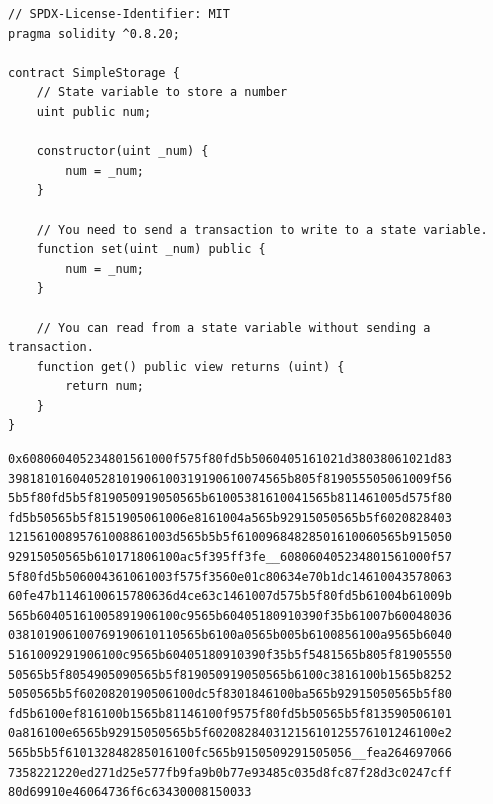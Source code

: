 \begin{lstlisting}[caption={Example of a simple Solidity smart contract that stores a variable on the blockchain and allows edits to it.},label={lst:solidity-example},captionpos=b, style=boxed]
// SPDX-License-Identifier: MIT
pragma solidity ^0.8.20;

contract SimpleStorage {
    // State variable to store a number
    uint public num;

    constructor(uint _num) {
        num = _num;
    }

    // You need to send a transaction to write to a state variable.
    function set(uint _num) public {
        num = _num;
    }

    // You can read from a state variable without sending a transaction.
    function get() public view returns (uint) {
        return num;
    }
}
\end{lstlisting}

\begin{lstlisting}[caption={EVM bytecode derived from compiling the contract shown in \cref{lst:solidity-example}. There are three parts divided by two underscores (\_\_). The first part is the deployment code, the second part is the runtime code and the last part is the CBOR-endoded metadata. This is what is stored on the blockchain and what can be retrieved.},label={lst:solc-result},captionpos=b, style=boxed,breaklines]
0x608060405234801561000f575f80fd5b5060405161021d38038061021d83
398181016040528101906100319190610074565b805f819055505061009f56
5b5f80fd5b5f819050919050565b61005381610041565b811461005d575f80
fd5b50565b5f8151905061006e8161004a565b92915050565b5f6020828403
12156100895761008861003d565b5b5f61009684828501610060565b915050
92915050565b610171806100ac5f395ff3fe__608060405234801561000f57
5f80fd5b506004361061003f575f3560e01c80634e70b1dc14610043578063
60fe47b1146100615780636d4ce63c1461007d575b5f80fd5b61004b61009b
565b60405161005891906100c9565b60405180910390f35b61007b60048036
038101906100769190610110565b6100a0565b005b6100856100a9565b6040
5161009291906100c9565b60405180910390f35b5f5481565b805f81905550
50565b5f8054905090565b5f819050919050565b6100c3816100b1565b8252
5050565b5f6020820190506100dc5f8301846100ba565b92915050565b5f80
fd5b6100ef816100b1565b81146100f9575f80fd5b50565b5f813590506101
0a816100e6565b92915050565b5f60208284031215610125576101246100e2
565b5b5f610132848285016100fc565b9150509291505056__fea264697066
7358221220ed271d25e577fb9fa9b0b77e93485c035d8fc87f28d3c0247cff
80d69910e46064736f6c63430008150033
\end{lstlisting}


